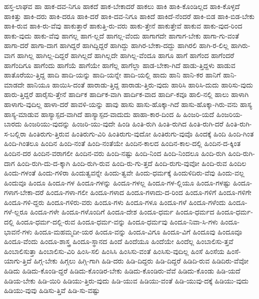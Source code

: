 {ಹಸ್ತ-ಲಾಘವ
ಹಾ
ಹಾಕ-ದವ-ನಿಗೂ
ಹಾಕದೆ
ಹಾಕ-ಬೇಕಾದರೆ
ಹಾಕಲು
ಹಾಕಿ
ಹಾಕಿ-ಕೊಂಡಿಲ್ಲದ
ಹಾಕಿ-ಕೊಳ್ಳದೆ
ಹಾಕಿತ್ತು
ಹಾಕಿ-ದರು
ಹಾಕಿ-ದರೂ
ಹಾಕಿ-ದರೆ
ಹಾಕಿ-ದವ-ನಿಗೂ
ಹಾಕಿದೆ
ಹಾಕಿದೆ-ನೆಂದರೆ
ಹಾಕಿ-ಬಿಡ
ಹಾಕಿ-ಬಿಡ-ಬೇಕು
ಹಾಕಿ-ರುವ
ಹಾಕಿ-ರು-ವೆವು
ಹಾಕುತ್ತಾರೆ
ಹಾಕುತ್ತಿ-ರು-ವರು
ಹಾಕು-ತ್ತೇನೆ
ಹಾಕುತ್ತೇವೆ
ಹಾಕುವ
ಹಾಕು-ವುದ-ರಿಂದ
ಹಾಕು-ವುದು
ಹಾಕು-ವೆವು
ಹಾಗಲ್ಲ
ಹಾಗ-ಲ್ಲದೆ
ಹಾಗಲ್ಲ-ವೆಂದು
ಹಾಗಾಗದೇ
ಹಾಗಾಗ-ಬೇಕು
ಹಾಗಾ-ಗು-ವಂತೆ
ಹಾಗಾ-ದರೆ
ಹಾಗಾ-ದಾಗ
ಹಾಗಿದ್ದರೆ
ಹಾಗಿದ್ದಿದ್ದರೆ
ಹಾಗಿದ್ದು
ಹಾಗಿರ-ಬೇಕಾ-ದದ್ದು
ಹಾಗಿರಲಿ
ಹಾಗಿ-ರ-ಲಿಲ್ಲ
ಹಾಗಿರು-ವಾಗ
ಹಾಗಿಲ್ಲ
ಹಾಗಿಲ್ಲ-ದಿದ್ದರೆ
ಹಾಗಿಲ್ಲದೆ
ಹಾಗಿಲ್ಲದೇ
ಹಾಗಿಲ್ಲ-ವೆಂದೂ
ಹಾಗೂ
ಹಾಗೆ
ಹಾಗೆಂದ
ಹಾಗೆಂದರೆ
ಹಾಗೆಂದಿಗೂ
ಹಾಗೆಂದು
ಹಾಗೆಯೆ
ಹಾಗೆಯೇ
ಹಾಗೆಲ್ಲ
ಹಾಗೆಲ್ಲಾ
ಹಾಡ-ಬೇಕಾ-ಗಿದೆ
ಹಾಡು-ತ್ತಿದ್ದಳು
ಹಾಡುವ
ಹಾತೊರೆಯು-ತ್ತಿದ್ದ
ಹಾದಿ
ಹಾದಿ-ಯನ್ನು
ಹಾದಿ-ಯನ್ನೇ
ಹಾದಿ-ಯಲ್ಲಿ
ಹಾದು
ಹಾನಿ
ಹಾನಿ-ಕರ
ಹಾನಿಗೆ
ಹಾನಿ-ಮಾಡದೇ
ಹಾನಿಯೂ
ಹಾಯಿಸಿ-ದಂತೆ
ಹಾರಾಡು-ತ್ತಿದ್ದ
ಹಾರಾಡು-ತ್ತಿರು-ವುದು
ಹಾರಿಸಿ
ಹಾರಿಸಿ-ದುದು
ಹಾರಿಸು-ವುದು
ಹಾರು-ತ್ತಿದ್ದರೆ
ಹಾರೈಸು-ತ್ತೇನೆ
ಹಾರ್ದಿಕ
ಹಾರ್ದಿಕ-ವಾಗಿ
ಹಾರ್ದಿಕ-ವಾದ
ಹಾರ್ದಿ-ಕವೂ
ಹಾಲಿ-ನಲ್ಲಿ
ಹಾಲು
ಹಾಳಾಗಿ
ಹಾಳಾಗು-ವುದಿಲ್ಲ
ಹಾಳಾ-ದರೆ
ಹಾವಳಿ-ಯನ್ನು
ಹಾವು
ಹಾಸು
ಹಾಸು-ಹೊಕ್ಕಾ-ಗಿದೆ
ಹಾಸು-ಹೊಕ್ಕಾ-ಗಿರು-ವನು
ಹಾಸ್ಯ
ಹಾಸ್ಯ-ಮಾಡುವ
ಹಾಸ್ಯಾಸ್ಪದ-ವಾಗಿದೆ
ಹಾಸ್ಯಾಸ್ಪದ-ವಾದುದು
ಹಾಹಾ-ಕಾರ-ದಿಂದ
ಹಿ
ಹಿಂಜರಿ-ಯದೆ
ಹಿಂಜರಿಯ-ಬಾರದು
ಹಿಂಜರಿಯು-ವುದನ್ನು
ಹಿಂಜರಿ-ಯು-ವುದೇ
ಹಿಂಡಿ
ಹಿಂತಿ-ರುಗಿ
ಹಿಂತಿ-ರುಗಿದ
ಹಿಂತಿ-ರುಗಿ-ದರೆ
ಹಿಂತಿ-ರುಗಿ-ಸ-ಬಲ್ಲಿರಾ
ಹಿಂತಿರುಗು-ತ್ತಿರುವ
ಹಿಂತಿರುಗು-ವಿರಿ
ಹಿಂತಿರುಗು-ವುದೋ
ಹಿಂತಿರುಗು-ವುವೊ
ಹಿಂದಕ್ಕೆ
ಹಿಂದಿ
ಹಿಂದಿ-ಗಿಂತ
ಹಿಂದಿ-ಗಿಂತಲೂ
ಹಿಂದಿನ
ಹಿಂದಿ-ನಂತೆ
ಹಿಂದಿ-ನಂತೆಯೇ
ಹಿಂದಿನ-ಕಾಲದ
ಹಿಂದಿನ-ಕಾಲ-ದಲ್ಲಿ
ಹಿಂದಿನ-ದ-ಕ್ಕಿಂತ
ಹಿಂದಿನ-ದರ
ಹಿಂದಿನ-ವರಾಗಲೀ
ಹಿಂದಿನ-ವರು
ಹಿಂದಿ-ನಷ್ಟು
ಹಿಂದಿ-ನಿಂದ
ಹಿಂದಿ-ನಿಂದಲೂ
ಹಿಂದಿ-ರುಗಿ
ಹಿಂದಿ-ರುಗಿ-ದಾಗ
ಹಿಂದಿ-ರುಗಿ-ದು-ದ-ಕ್ಕಾಗಿ
ಹಿಂದಿ-ರುಗಿ-ರುವ
ಹಿಂದಿ-ರು-ಗು-ತ್ತದೆ
ಹಿಂದಿ-ರುಗು-ವುವೋ
ಹಿಂದಿ-ರುವ
ಹಿಂದಿಲ
ಹಿಂದು-ಗಳಂತೆ
ಹಿಂದು-ಗಳಿರಾ
ಹಿಂದುತ್ವವನ್ನೇ
ಹಿಂದು-ತ್ವವೇ
ಹಿಂದು-ಧರ್ಮಕ್ಕೆ
ಹಿಂದುಳಿದಿರು-ವೆವು
ಹಿಂದು-ವಲ್ಲ
ಹಿಂದುವೂ
ಹಿಂದೂ
ಹಿಂದೂ-ಗಳ
ಹಿಂದೂ-ಗಳನ್ನು
ಹಿಂದೂ-ಗಳಲ್ಲ
ಹಿಂದೂ-ಗಳ-ಲ್ಲಿಯೂ
ಹಿಂದೂ-ಗಳಷ್ಟು
ಹಿಂದೂ-ಗಳಾಗ-ಬೇಕಾ-ದರೆ
ಹಿಂದೂ-ಗಳಾ-ಗಲೀ
ಹಿಂದೂ-ಗಳಾದ
ಹಿಂದೂ-ಗಳಾದು-ದ-ರಿಂದ
ಹಿಂದೂ-ಗಳಿಗೆ
ಹಿಂದೂ-ಗಳಿಗೇ
ಹಿಂದೂ-ಗಳಿ-ದ್ದರು
ಹಿಂದೂ-ಗಳಿರು-ವರು
ಹಿಂದೂ-ಗಳು
ಹಿಂದೂ-ಗಳೂ
ಹಿಂದೂ-ಗಳೆ
ಹಿಂದೂ-ಗಳೆಂದು
ಹಿಂದೂ-ಗಳೆ-ಲ್ಲರೂ
ಹಿಂದೂ-ಗಳೇ
ಹಿಂದೂ-ಗಳೊಂದಿಗೆ
ಹಿಂದೂ-ದೇಶ
ಹಿಂದೂ-ಧರ್ಮ
ಹಿಂದೂ-ಧರ್ಮದ
ಹಿಂದೂ-ಧರ್ಮ-ದಲ್ಲಿ
ಹಿಂದೂ-ಧರ್ಮ-ದಲ್ಲಿ-ರುವ
ಹಿಂದೂ-ಧರ್ಮ-ವನ್ನು
ಹಿಂದೂ-ಧರ್ಮವು
ಹಿಂದೂ-ನಿವಾ-ಸಿ-ಗಳು
ಹಿಂದೂ-ಭಾವನೆ-ಗಳು
ಹಿಂದೂ-ಮಹಮ್ಮದೀ-ಯರ
ಹಿಂದೂ-ವನ್ನು
ಹಿಂದೂ-ವಿಗೂ
ಹಿಂದೂ-ವಿಗೆ
ಹಿಂದೂವು
ಹಿಂದೂವೂ
ಹಿಂದೂ-ವೆಂದು
ಹಿಂದೂ-ಶಾಸ್ತ್ರ
ಹಿಂದೂ-ಸ್ಥಾನದ
ಹಿಂದೆ
ಹಿಂದೆಯೂ
ಹಿಂದೆಯೇ
ಹಿಂದೆಲ್ಲ
ಹಿಂಬಾಲಿಸು-ತ್ತವೆ
ಹಿಂಬಾಲಿಸುತ್ತಾ
ಹಿಂಬಾಲಿಸು-ವಿರಿ
ಹಿಂಸಿ-ಸಲಿ
ಹಿಂಸಿಸಿ
ಹಿಂಸಿಸು-ವಂತೆ
ಹಿಂಸಿಸು-ವುದಿಲ್ಲ
ಹಿಂಸೆ
ಹಿಂಸೆಯ
ಹಿಂಸೆ-ಯಾಗು-ತ್ತಿದೆ
ಹಿಗ್ಗ-ಬೇಕು
ಹಿಗ್ಗಲು
ಹಿಗ್ಗಿ-ಗಾಗಿ
ಹಿಡಿ-ದರು
ಹಿಡಿ-ದಿದ್ದರು
ಹಿಡಿ-ದಿದ್ದರೆ
ಹಿಡಿದಿ-ರುವ
ಹಿಡಿದಿರು-ವೆವೋ
ಹಿಡಿದು
ಹಿಡಿದು-ಕೊಂಡಿ-ದ್ದರೆ
ಹಿಡಿದು-ಕೊಂಡಿರ-ಬೇಕು
ಹಿಡಿದು-ಕೊಂಡಿರು-ವೆವೆ
ಹಿಡಿದು-ಕೊಂಡು
ಹಿಡಿ-ಯದೆ
ಹಿಡಿಯ-ಬೇಕು
ಹಿಡಿ-ಯಿರಿ
ಹಿಡಿಯು-ತ್ತಿರು-ವುದು
ಹಿಡಿ-ಯುವ
ಹಿಡಿಯು-ವಂತೆ
ಹಿಡಿ-ಯುವು-ದಕ್ಕೆ
ಹಿಡಿಯು-ವುದು
ಹಿಡಿಯು-ವುವು
ಹಿಡಿಸು-ತ್ತಿವೆ
ಹಿಡಿ-ಸು-ವಷ್ಟು
}
